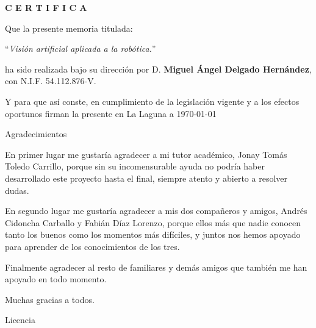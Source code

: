 \documentclass[spanish,a4paper,14pt,oneside]{extreport}
\begin{document}
\bigskip
\bigskip
{\bf C E R T I F I C A}

\bigskip
\bigskip
\bigskip
Que la presente memoria titulada:

\bigskip
``{\it Visión artificial aplicada a la robótica.}''

\bigskip
\bigskip
\bigskip

\noindent ha sido realizada bajo su dirección por D. {\bf Miguel Ángel Delgado Hernández},
con N.I.F. 54.112.876-V.

\bigskip
\bigskip

Y para que así conste, en cumplimiento de la legislación vigente y a los efectos
oportunos firman la presente en La Laguna a \today

\newpage
\thispagestyle{empty}

{ \flushright

\begin{LARGE}
Agradecimientos
\end{LARGE}

\hspace{3mm}

\begin{large}


\hspace{3mm}
En primer lugar me gustaría agradecer a mi tutor académico, Jonay Tomás Toledo
Carrillo, porque sin su incomensurable ayuda no podría haber desarrollado este
proyecto hasta el final, siempre atento y abierto a resolver dudas.

\hspace{3mm}
En segundo lugar me gustaría agradecer a mis dos compañeros y amigos, Andrés
Cidoncha Carballo y Fabián Díaz Lorenzo, porque ellos más que nadie conocen
tanto los buenos como los momentos más difíciles, y juntos nos hemos apoyado
para aprender de los conocimientos de los tres.

\hspace{3mm}
Finalmente agradecer al resto de familiares y demás amigos que también me han
apoyado en todo momento. 

\hspace{3mm}
Muchas gracias a todos.


\end{large}

}

\newpage

\begin{huge}
Licencia
\end{huge}
\end{document}
